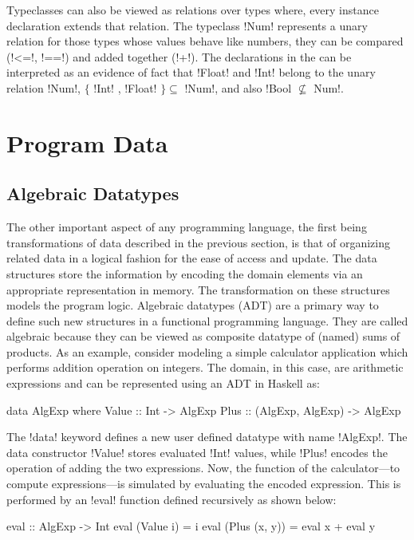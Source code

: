 \documentclass[screen,nonacm,manuscript,review]{acmart} %
\begin{document}
Typeclasses can also be viewed as relations over types\cite{morris_simple_2014}
where, every instance declaration extends that relation. The typeclass !Num!
represents a unary relation for those types whose values behave like
numbers, they can be compared (!<=!, !==!) and added together (!+!).
The declarations in the  can be interpreted as an
evidence of fact that !Float! and !Int! belong to the unary relation
!Num!, $\{$ !Int! , !Float! $\} \subseteq$ !Num!, and also !Bool $\not\subseteq$ Num!.


\section{Program Data}
\subsection{Algebraic Datatypes}
The other important aspect of any programming language, the first
being transformations of data described in the previous section, is
that of organizing related data in a logical fashion for the ease of
access and update. The data structures store the information by
encoding the domain elements via an appropriate representation in
memory. The transformation on these structures models the program
logic. Algebraic datatypes (ADT) are a primary way
to define such new structures in a functional programming language. They are called
algebraic because they can be viewed as composite datatype of (named)
sums of products. As an example, consider modeling a simple calculator
application which performs addition operation on integers. The domain,
in this case, are arithmetic expressions and can be represented using an
ADT in Haskell as:

\begin{CenteredBox}
\begin{code}
data AlgExp where
   Value :: Int -> AlgExp
   Plus :: (AlgExp, AlgExp) -> AlgExp
\end{code}
\end{CenteredBox}

The !data! keyword defines a new user defined datatype with name
!AlgExp!. The data constructor !Value! stores evaluated !Int! values,
while !Plus! encodes the operation of adding the two expressions. Now,
the function of the calculator---to compute expressions---is simulated
by evaluating the encoded expression. This is performed by an !eval!
function defined recursively as shown below:

\begin{CenteredBox}
\begin{code}
eval :: AlgExp -> Int
eval (Value i) = i
eval (Plus (x, y)) = eval x + eval y
\end{code}
\end{CenteredBox}
\end{document}

